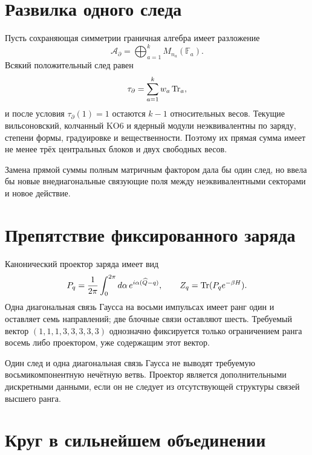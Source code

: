 \section{Развилка одного следа}

Пусть сохраняющая симметрии граничная алгебра имеет разложение
\begin{equation}
 \mathcal A_\partial=\bigoplus_{a=1}^{k}M_{n_a}(\mathbb F_a).
\end{equation}
Всякий положительный след равен
\begin{equation}
 \tau_\partial=\sum_{a=1}^{k}w_a\operatorname{Tr}_a,
\end{equation}
и после условия \(\tau_\partial(1)=1\) остаются \(k-1\) относительных весов.
Текущие вильсоновский, колчанный KO6 и ядерный модули неэквивалентны по
заряду, степени формы, градуировке и вещественности. Поэтому их прямая сумма
имеет не менее трёх центральных блоков и двух свободных весов.

Замена прямой суммы полным матричным фактором дала бы один след, но ввела бы
новые внедиагональные связующие поля между неэквивалентными секторами и новое
действие.

\section{Препятствие фиксированного заряда}

Канонический проектор заряда имеет вид
\begin{equation}
 P_q=\frac1{2\pi}\int_0^{2\pi}d\alpha\,
 e^{i\alpha(\widehat Q-q)},
 \qquad Z_q=\operatorname{Tr}(P_qe^{-\beta H}).
\end{equation}
Одна диагональная связь Гаусса на восьми импульсах имеет ранг один и
оставляет семь направлений; две блочные связи оставляют шесть. Требуемый
вектор \((1,1,1,3,3,3,3,3)\) однозначно фиксируется только ограничением
ранга восемь либо проектором, уже содержащим этот вектор.

\begin{theorem}
Один след и одна диагональная связь Гаусса не выводят требуемую
восьмикомпонентную нечётную ветвь. Проектор является дополнительными
дискретными данными, если он не следует из отсутствующей структуры связей
высшего ранга.
\end{theorem}

\section{Круг в сильнейшем объединении}


